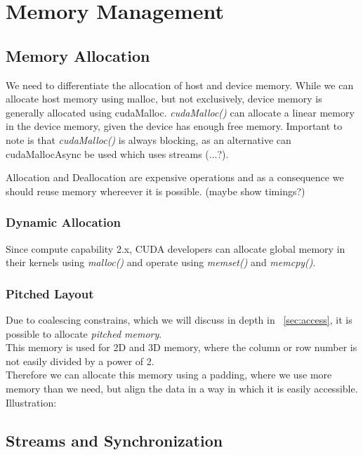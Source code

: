 \section{Memory Management}
\label{sec:management}
\subsection{Memory Allocation}
\label{sec:mem_alloc}
We need to differentiate the allocation of host and device memory.
While we can allocate host memory using malloc, but not exclusively, device memory is generally allocated using cudaMalloc.
\emph{cudaMalloc()} can allocate a linear memory in the device memory, given the device has enough free memory.
Important to note is that \emph{cudaMalloc()} is always blocking, as an alternative can cudaMallocAsync be used which uses streams (...?).



Allocation and Deallocation are expensive operations and as a consequence we should reuse memory whereever it is possible.
(maybe show timings?)
\subsubsection{Dynamic Allocation}
Since compute capability 2.x, CUDA developers can allocate global memory in their kernels using \emph{malloc()} and operate using \emph{memset()} and \emph{memcpy()}.
\subsubsection{Pitched Layout}
Due to coalescing constrains, which we will discuss in depth in ~\ref{sec:access}, it is possible to allocate \emph{pitched memory}.\\
This memory is used for 2D and 3D memory, where the column or row number is not easily divided by a power of 2.\\
Therefore we can allocate this memory using a padding, where we use more memory than we need, but align the data in a way in which it is easily accessible.\\
Illustration:
\subsection{Streams and Synchronization}
